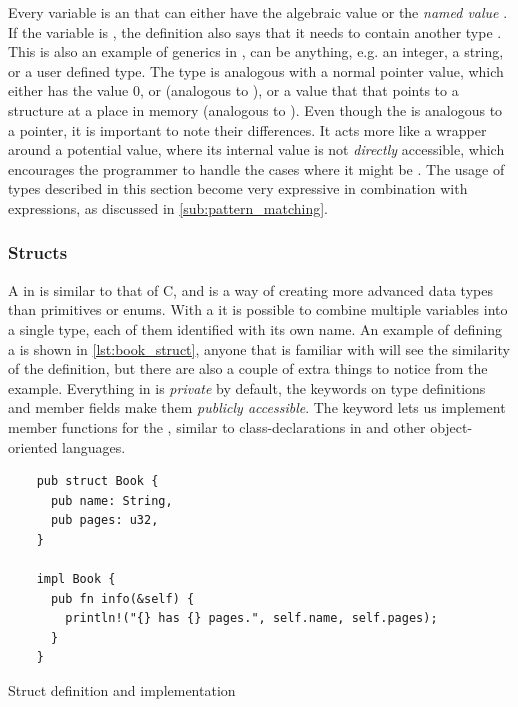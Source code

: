 Every  variable is an {\enum} that can either have the algebraic value  or the \emph{named value} .
If the variable is , the definition also says that it needs to contain another type .
This is also an example of generics in {\rust},  can be anything, e.g. an integer, a string, or a user defined type.
The  type is analogous with a normal {\C} pointer value, which either has the value 0, or  (analogous to ), or a value that that points to a structure at a place in memory (analogous to ).
Even though the  is analogous to a {\C} pointer, it is important to note their differences.
It acts more like a wrapper around a potential value, where its internal value is not \emph{directly} accessible, which encourages the programmer to handle the cases where it might be .
The usage of {\enum} types described in this section become very expressive in combination with  expressions, as discussed in \autoref{sub:pattern_matching}.

\subsubsection{Structs}
\label{ssub:structs}

A  in {\rust} is similar to that of C, and is a way of creating more advanced data types than primitives or enums.
With a  it is possible to combine multiple variables into a single type, each of them identified with its own name.
An example of defining a  is shown in \autoref{lst:book_struct}, anyone that is familiar with {\C} will see the similarity of the  definition, but there are also a couple of extra things to notice from the example.
Everything in {\rust} is \emph{private} by default, the  keywords on type definitions and member fields make them \emph{publicly accessible}.
The  keyword lets us implement member functions for the , similar to class-declarations in {\Cpp} and other object-oriented languages.

\begin{listing}[H]
  \begin{verbatim}
    pub struct Book {
      pub name: String,
      pub pages: u32,
    }

    impl Book {
      pub fn info(&self) {
        println!("{} has {} pages.", self.name, self.pages);
      }
    }
  \end{verbatim}
  \caption{Struct definition and implementation}
  \label{lst:book_struct}
\end{listing}

